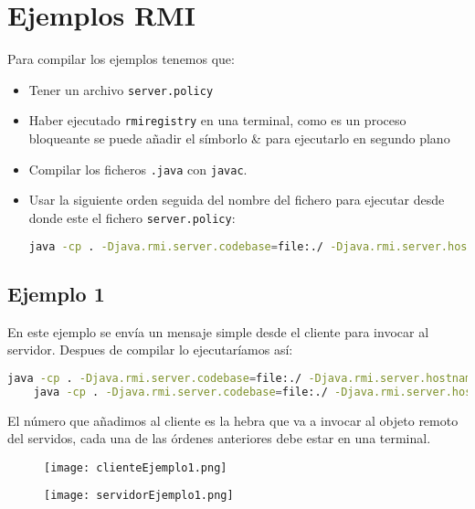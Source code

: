 \chapter{Ejemplos RMI}

Para compilar los ejemplos tenemos que:

\begin{itemize}
	\item Tener un archivo \texttt{server.policy}
	\item Haber ejecutado \texttt{rmiregistry} en una terminal, como es un proceso
	bloqueante se puede añadir el símborlo \& para ejecutarlo en segundo plano
	\item Compilar los ficheros \texttt{.java} con \texttt{javac}.
	\item Usar la siguiente orden seguida del nombre del fichero para ejecutar desde donde este el fichero \texttt{server.policy}:
	\begin{lstlisting}[language=sh]
		java -cp . -Djava.rmi.server.codebase=file:./ -Djava.rmi.server.hostname=localhost -Djava.security.policy=server.policy "fichero a ejecutar"
	\end{lstlisting}
\end{itemize}

\section{Ejemplo 1}
En este ejemplo se envía un mensaje simple desde el cliente para invocar al servidor. Despues de compilar lo ejecutaríamos así:
\begin{lstlisting}[language=sh]
	java -cp . -Djava.rmi.server.codebase=file:./ -Djava.rmi.server.hostname=localhost -Djava.security.policy=server.policy ejemplo1.Ejemplo
	java -cp . -Djava.rmi.server.codebase=file:./ -Djava.rmi.server.hostname=localhost -Djava.security.policy=server.policy ejemplo1.Cliente_Ejemplo localhost 1554
\end{lstlisting}

El número que añadimos al cliente es la hebra que va a invocar al objeto remoto del servidos, cada una de las órdenes anteriores debe estar en una terminal.

\begin{figure}[!ht]
	\begin{center}
		\texttt{[image: clienteEjemplo1.png]}
	\end{center}
\end{figure}

\begin{figure}[!ht]
	\begin{center}
		\texttt{[image: servidorEjemplo1.png]}
	\end{center}
\end{figure}

